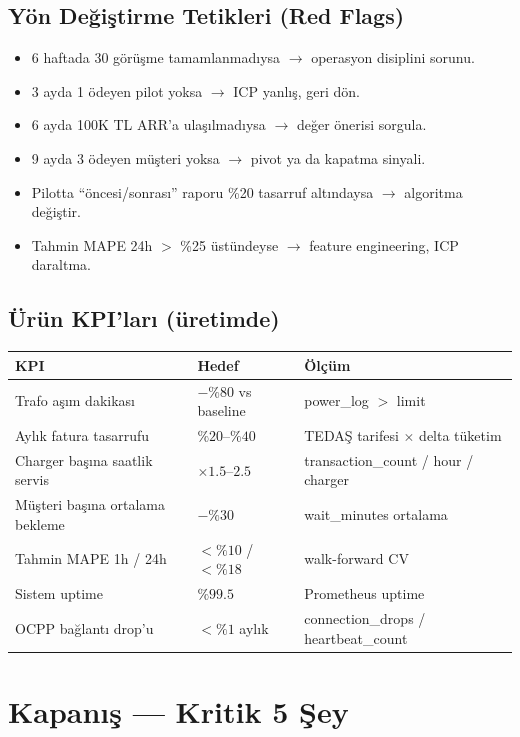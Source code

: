 \documentclass[11pt,a4paper]{article}
\begin{document}
\subsection{Yön Değiştirme Tetikleri (Red Flags)}

\begin{itemize}
    \item 6 haftada 30 görüşme tamamlanmadıysa $\rightarrow$ operasyon disiplini sorunu.
    \item 3 ayda 1 ödeyen pilot yoksa $\rightarrow$ ICP yanlış, geri dön.
    \item 6 ayda 100K TL ARR'a ulaşılmadıysa $\rightarrow$ değer önerisi sorgula.
    \item 9 ayda 3 ödeyen müşteri yoksa $\rightarrow$ pivot ya da kapatma sinyali.
    \item Pilotta ``öncesi/sonrası'' raporu \%20 tasarruf altındaysa $\rightarrow$ algoritma değiştir.
    \item Tahmin MAPE 24h $>$ \%25 üstündeyse $\rightarrow$ feature engineering, ICP daraltma.
\end{itemize}

\subsection{Ürün KPI'ları (üretimde)}

\begin{tabularx}{\textwidth}{l l X}
\toprule
\textbf{KPI} & \textbf{Hedef} & \textbf{Ölçüm} \\
\midrule
Trafo aşım dakikası & $-\%80$ vs baseline & power\_log $>$ limit \\
Aylık fatura tasarrufu & $\%20$--$\%40$ & TEDAŞ tarifesi $\times$ delta tüketim \\
Charger başına saatlik servis & $\times 1.5$--$2.5$ & transaction\_count / hour / charger \\
Müşteri başına ortalama bekleme & $-\%30$ & wait\_minutes ortalama \\
Tahmin MAPE 1h / 24h & $<\%10$ / $<\%18$ & walk-forward CV \\
Sistem uptime & $\%99.5$ & Prometheus uptime \\
OCPP bağlantı drop'u & $<\%1$ aylık & connection\_drops / heartbeat\_count \\
\bottomrule
\end{tabularx}

\section{Kapanış --- Kritik 5 Şey}
\end{document}
